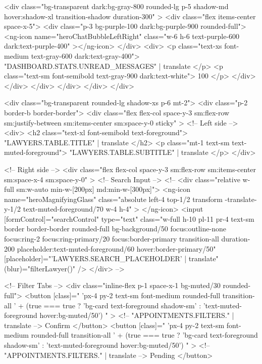       <div
        class="bg-transparent dark:bg-gray-800 rounded-lg p-5 shadow-md hover:shadow-xl transition-shadow duration-300"
      >
        <div class="flex items-center space-x-5">
          <div class="p-3 bg-purple-100 dark:bg-purple-900 rounded-full">
            <ng-icon
              name="heroChatBubbleLeftRight"
              class="w-6 h-6 text-purple-600 dark:text-purple-400"
            ></ng-icon>
          </div>
          <div>
            <p class="text-xs font-medium text-gray-600 dark:text-gray-400">
              {{ "DASHBOARD.STATS.UNREAD_MESSAGES" | translate }}
            </p>
            <p class="text-sm font-semibold text-gray-900 dark:text-white">
              100
            </p>
          </div>
        </div>
      </div>
    </div>
  </div>
</div>

<div class="bg-transparent rounded-lg shadow-xs p-6 mt-2">
  <div class="p-2 border-b border-border">
    <div
      class="flex flex-col space-y-3 sm:flex-row sm:justify-between sm:items-center sm:space-y-0 sticky"
    >
      <!-- Left side -->
      <div>
        <h2 class="text-xl font-semibold text-foreground">
          {{ "LAWYERS.TABLE.TITLE" | translate }}
        </h2>
        <p class="mt-1 text-sm text-muted-foreground">
          {{ "LAWYERS.TABLE.SUBTITLE" | translate }}
        </p>
      </div>

      <!-- Right side -->
      <div
        class="flex flex-col space-y-3 sm:flex-row sm:items-center sm:space-x-4 sm:space-y-0"
      >
        <!-- Search Input -->
        <!-- <div class="relative w-full sm:w-auto min-w-[200px] md:min-w-[300px]">
          <ng-icon
            name="heroMagnifyingGlass"
            class="absolute left-4 top-1/2 transform -translate-y-1/2 text-muted-foreground/70 w-4 h-4"
          >
          </ng-icon>
          <input
            [formControl]="searchControl"
            type="text"
            class="w-full h-10 pl-11 pr-4 text-sm border border-border rounded-full bg-background/50 focus:outline-none focus:ring-2 focus:ring-primary/20 focus:border-primary transition-all duration-200 placeholder:text-muted-foreground/60 hover:border-primary/50"
            [placeholder]="'LAWYERS.SEARCH_PLACEHOLDER' | translate"
            (blur)="filterLawyer()"
          />
        </div> -->

        <!-- Filter Tabs -->
        <div class="inline-flex p-1 space-x-1 bg-muted/30 rounded-full">
          <button
            [class]="
              'px-4 py-2 text-sm font-medium rounded-full transition-all ' +
              (true === true
                ? 'bg-card text-foreground shadow-sm'
                : 'text-muted-foreground hover:bg-muted/50')
            "
          >
            <!-- {{ "APPOINTMENTS.FILTERS." | translate }} -->
            Confirm
          </button>
          <button
            [class]="
              'px-4 py-2 text-sm font-medium rounded-full transition-all ' +
              (true === true
                ? 'bg-card text-foreground shadow-sm'
                : 'text-muted-foreground hover:bg-muted/50')
            "
          >
            <!-- {{ "APPOINTMENTS.FILTERS." | translate }} -->
            Pending
          </button>


